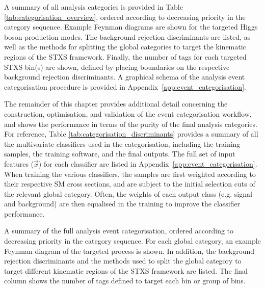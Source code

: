 A summary of all analysis categories is provided in Table \ref{tab:categorisation_overview}, ordered according to decreasing priority in the category sequence. Example Feynman diagrams are shown for the targeted Higgs boson production modes. The background rejection discriminants are listed, as well as the methods for splitting the global categories to target the kinematic regions of the STXS framework. Finally, the number of tags for each targeted STXS bin(s) are shown, defined by placing boundaries on the respective background rejection discriminants. A graphical schema of the analysis event categorisation procedure is provided in Appendix~\ref{app:event_categorisation}.

The remainder of this chapter provides additional detail concerning the construction, optimisation, and validation of the event categorisation workflow, and shows the performance in terms of the purity of the final analysis categories. For reference, Table \ref{tab:categorisation_discriminants} provides a summary of all the multivariate classifiers used in the categorisation, including the training samples, the training software, and the final outputs. The full set of input features ($\vec{x}$) for each classifier are listed in Appendix~\ref{app:event_categorisation}. When training the various classifiers, the samples are first weighted according to their respective SM cross sections, and are subject to the initial selection cuts of the relevant global category. Often, the weights of each output class (e.g. signal and background) are then equalised in the training to improve the classifier performance.

\begin{table}[htb]
    \caption[Categorisation overview]{A summary of the full analysis event categorisation, ordered according to decreasing priority in the category sequence. For each global category, an example Feynman diagram of the targeted process is shown. In addition, the background rejection discriminants and the methods used to split the global category to target different kinematic regions of the STXS framework are listed. The final column shows the number of tags defined to target each bin or group of bins.}
    \label{tab:categorisation_overview}
    \centering
    \tiny
    \renewcommand{\arraystretch}{1.3}
    \setlength{\tabcolsep}{2pt}
    \hspace*{-3cm}
    
    \hspace*{-3cm}
\end{table}

